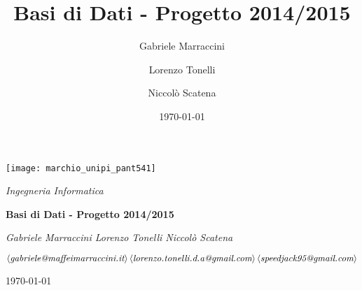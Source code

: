 \title{Basi di Dati - Progetto 2014/2015}
\author{Gabriele Marraccini \and Lorenzo Tonelli \and Niccolò Scatena}
\date{\today}


\begin{titlepage}
\centering
    \texttt{[image: marchio\_unipi\_pant541]}\par\vspace{0.6cm}
    {\large\itshape Ingegneria Informatica\par}
    \vspace{2.5cm}
    {\Huge\bfseries Basi di Dati - Progetto 2014/2015\par}
    \vfill
    {\LARGE\itshape Gabriele Marraccini \hfill Lorenzo Tonelli \hfill Niccolò Scatena\par}\vspace{0.2cm}
    {\small \(\left\langle\textit{gabriele@maffeimarraccini.it}\right\rangle \hfill \left\langle\textit{lorenzo.tonelli.d.a@gmail.com}\right\rangle \hfill \left\langle\textit{speedjack95@gmail.com}\right\rangle\)\par}

    \vfill


    {\large \today\par}
\end{titlepage}

\restoregeometry
